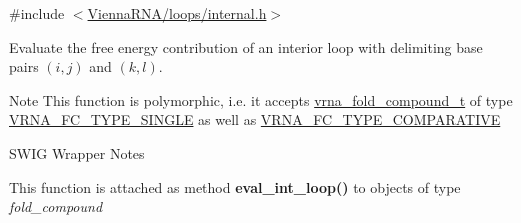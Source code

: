 {\ttfamily \#include $<$\mbox{\hyperlink{internal_8h}{Vienna\+R\+N\+A/loops/internal.\+h}}$>$}



Evaluate the free energy contribution of an interior loop with delimiting base pairs $(i,j)$ and $(k,l)$. 

\begin{DoxyNote}{Note}
This function is polymorphic, i.\+e. it accepts \mbox{\hyperlink{group__fold__compound_ga1b0cef17fd40466cef5968eaeeff6166}{vrna\+\_\+fold\+\_\+compound\+\_\+t}} of type \mbox{\hyperlink{group__fold__compound_gga01a4ff86fa71deaaa5d1abbd95a1447da7e264dd3cf2dc9b6448caabcb7763cd6}{V\+R\+N\+A\+\_\+\+F\+C\+\_\+\+T\+Y\+P\+E\+\_\+\+S\+I\+N\+G\+LE}} as well as \mbox{\hyperlink{group__fold__compound_gga01a4ff86fa71deaaa5d1abbd95a1447dab821ce46ea3cf665be97df22a76f5023}{V\+R\+N\+A\+\_\+\+F\+C\+\_\+\+T\+Y\+P\+E\+\_\+\+C\+O\+M\+P\+A\+R\+A\+T\+I\+VE}}
\end{DoxyNote}
\begin{DoxyRefDesc}{S\+W\+I\+G Wrapper Notes}
\item[\mbox{\hyperlink{wrappers__wrappers000052}{S\+W\+I\+G Wrapper Notes}}]This function is attached as method {\bfseries{eval\+\_\+int\+\_\+loop()}} to objects of type {\itshape fold\+\_\+compound} \end{DoxyRefDesc}

